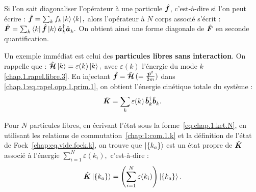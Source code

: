 {

Si l’on sait diagonaliser l’opérateur à une particule \( \hat{\bm{f}} \), c’est-à-dire si l’on peut écrire :
\(
	\hat{\bm{f}} = \sum_k f_k \ket{k} \bra{k},
\)
alors l’opérateur à $N$ corps associé s’écrit :
\(
	\hat{\bm{F}} = \sum_k \bra{k} \hat{\bm{f}} \ket{k} \hat{\bm{a}}^\dagger_k \hat{\bm{a}}_k^{}.
\)
On obtient ainsi une forme diagonale de \( \hat{\bm{F}} \) en seconde quantification.

Un exemple immédiat est celui des \textbf{particules libres sans interaction}. On rappelle que :
\(
	\hat{\bm{\mathcal{H}}} \ket{k} = \varepsilon(k) \ket{k},
\)
avec $\varepsilon(k)$ l’énergie du mode $k$ \eqref{chap.1.rapel.libre.3}.
En injectant $\hat{\bm{f}} = \hat{\bm{\mathcal{H}}} \,( = \frac{\hat{\bm{p}}^2}{2m})$ dans \eqref{chap.1:eq.rapel.opp.1.prim.1}, on obtient l’énergie cinétique totale du système :
\begin{equation}
	\hat{\bm{K}} = \sum_{k} \varepsilon(k) \, \hat{\bm{b}}^\dagger_k \hat{\bm{b}}_k^{}.\label{eq.chap.1.cinietique.1}
\end{equation}

Pour $N$ particules libres, en écrivant l’état sous la forme~\eqref{eq.chap.1.ket.N}, en utilisant les relations de commutation~\eqref{chap:1:com.1.k} et la définition de l’état de Fock~\eqref{chap:eq.vide.fock.k}, on trouve que $\ket{\{k_a\}}$ est un état propre de $\hat{\bm{K}}$ associé à l’énergie
\(
	\sum_{i = 1}^N \varepsilon(k_i),
\)
c’est-à-dire :
\begin{eqnarray}
	\hat{\bm{K}} \ket{\{k_a\}} = \left( \sum_{i = 1}^N \varepsilon(k_i) \right) \ket{\{k_a\}}.\label{eq.chap.1.cinietique.2}
\end{eqnarray}

}

